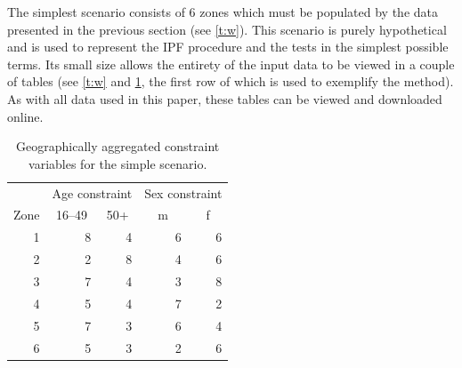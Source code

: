 \documentclass[a4paper,10pt]{article}
\begin{document}
The simplest scenario consists of 6 zones which must be populated by the
data presented in the previous section (see \cref{t:w}).
This scenario is purely hypothetical and is used to represent the IPF procedure
and the tests in the simplest possible terms. Its small size allows the entirety
of the input data to be viewed in a couple of tables 
(see \cref{t:w} and \cref{t2}, the first row of which is used
to exemplify the method). As with all
data used in this paper, these tables can be
viewed and downloaded online.


\begin{table}[htbp]
\caption{Geographically aggregated constraint variables for the simple
scenario.}
\begin{center}
\begin{tabular}{rrrrr}
\toprule
\multicolumn{1}{l}{} & \multicolumn{2}{c}{Age constraint} & \multicolumn{2}{c}{Sex constraint} \\
\multicolumn{1}{l}{Zone} & \multicolumn{1}{c}{16--49} & \multicolumn{1}{c}{50+} & \multicolumn{1}{c}{m} & \multicolumn{1}{c}{f} \\
\midrule
1 & 8 & 4 & 6 & 6 \\
2 & 2 & 8 & 4 & 6 \\
3 & 7 & 4 & 3 & 8 \\
4 & 5 & 4 & 7 & 2 \\
5 & 7 & 3 & 6 & 4 \\
6 & 5 & 3 & 2 & 6 \\
\bottomrule
\end{tabular}
\end{center}
\label{t2}
\end{table}
\end{document}
